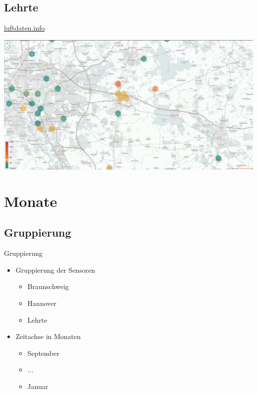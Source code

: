 \documentclass[aspectratio=169]{beamer} %
\begin{document}
\subsection{Lehrte}
\begin{frame}{\href{http://hannover.maps.luftdaten.info/\#12/52.373/10.005}{luftdaten.info}}
  \begin{center}
    \includegraphics[width=\textwidth]{../screenshots/luftdaten-zoom-a.png}
  \end{center}
\end{frame}

\section{Monate}
\subsection{Gruppierung}
\begin{frame}{Gruppierung}
  \begin{itemize}
  \item Gruppierung der Sensoren
    \begin{itemize}
    \item Braunschweig
    \item Hannover
    \item Lehrte
    \end{itemize}
  \item Zeitachse in Monaten
    \begin{itemize}
    \item September
    \item ...
    \item Januar
    \end{itemize}
  \end{itemize}

\end{frame}
\end{document}
